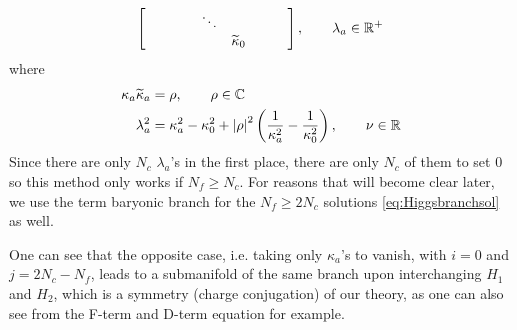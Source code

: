\begin{itemize}
\begin{itemize}[label=$\triangleright$]
\begin{align}
\begin{split}
\begin{bmatrix}
                            & & & & \ddots & & & & \\
                            & & & & & \widetilde{\kappa}_0 & & &
                        \end{bmatrix},\qquad\lambda_a\in\mathbb{R}^+\\
                    \end{split}\label{eq:baryonicbranch}
                    \end{align}
                    where
                    \begin{align}
                        \kappa_a\widetilde{\kappa}_a &= \rho,\qquad\rho\in\mathbb{C}\\
                        \lambda^2_a &= \kappa^2_a-\kappa^2_0+\abs{\rho}^2\left(\frac{1}{\kappa^2_a}-\frac{1}{\kappa^2_0}\right),\qquad\nu\in\mathbb{R} 
                    \end{align}
                    Since there are only $N_c$ $\lambda_a$'s in the first place, there are only $N_c$ of them to set $0$ so this method only works if $N_f\geq N_c$. For reasons that will become clear later, we use the term baryonic branch for the $N_f\geq 2N_c$ solutions \eqref{eq:Higgsbranchsol} as well.
                    
                    One can see that the opposite case, i.e. taking only $\kappa_a$'s to vanish, with $i=0$ and $j=2N_c-N_f$, leads to a submanifold of the same branch upon interchanging $H_1$ and $H_2$, which is a symmetry (charge conjugation) of our theory, as one can also see from the F-term and D-term equation for example.


\end{itemize}
\end{itemize}
